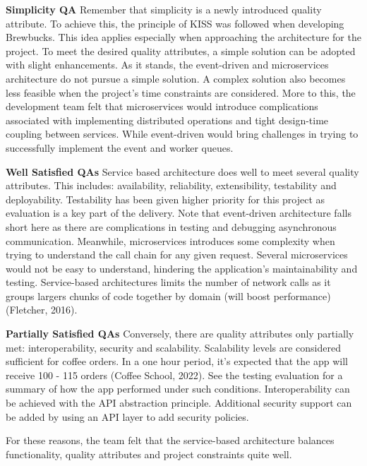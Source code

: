 \documentclass{article}
\begin{document}
\medskip \noindent \textbf{Simplicity QA}
\hfill \break Remember that simplicity is a newly introduced quality attribute. To achieve this, the principle of KISS was followed when developing Brewbucks. This idea applies especially when approaching the architecture for the project. To meet the desired quality attributes, a simple solution can be adopted with slight enhancements. As it stands, the event-driven and microservices architecture do not pursue a simple solution. A complex solution also becomes less feasible when the project's time constraints are considered. More to this, the development team felt that microservices would introduce complications associated with implementing distributed operations and tight design-time coupling between services. While event-driven would bring challenges in trying to successfully implement the event and worker queues.

\medskip \noindent \textbf{Well Satisfied QAs}
\hfill \break Service based architecture does well to meet several quality attributes. This includes: availability, reliability, extensibility, testability and deployability. Testability has been given higher priority for this project as evaluation is a key part of the delivery. Note that event-driven architecture falls short here as there are complications in testing and debugging asynchronous communication. Meanwhile, microservices introduces some complexity when trying to understand the call chain for any given request. Several microservices would not be easy to understand, hindering the application's maintainability and testing. Service-based architectures limits the number of network calls as it groups largers chunks of code together by domain (will boost performance) (Fletcher, 2016).

\medskip \noindent \textbf{Partially Satisfied QAs}
\hfill \break Conversely, there are quality attributes only partially met: interoperability, security and scalability. Scalability levels are considered sufficient for coffee orders. In a one hour period, it's expected that the app will receive 100 - 115 orders (Coffee School, 2022). See the testing evaluation for a summary of how the app performed under such conditions. Interoperability can be achieved with the API abstraction principle. Additional security support can be added by using an API layer to add security policies.

\hfill \break For these reasons, the team felt that the service-based architecture balances functionality, quality attributes and project constraints quite well.  
\end{document}
